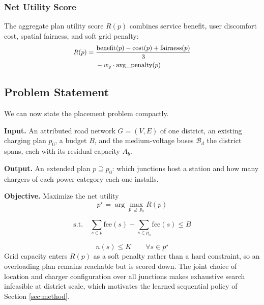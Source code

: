 \documentclass[10pt, conference, a4paper, compsocconf]{IEEEtran}
\begin{document}
\subsubsection{Net Utility Score}
The aggregate plan utility score $R(p)$ combines service benefit, user discomfort cost, spatial fairness, and soft grid penalty:
\begin{equation}\small
\begin{aligned}
R(p) = {} & \frac{\text{benefit}(p) - \text{cost}(p) + \text{fairness}(p)}{3} \\
          & - w_g \cdot \text{avg\_penalty}(p)
\end{aligned}
\end{equation}
\subsection{Problem Statement}

We can now state the placement problem compactly.

\textbf{Input.} An attributed road network $G=(V,E)$ of one district, an existing charging plan $p_0$, a budget $B$, and the medium-voltage buses $\mathcal{B}_d$ the district spans, each with its residual capacity $A_b$.

\textbf{Output.} An extended plan $p \supseteq p_0$: which junctions host a station and how many chargers of each power category each one installs.

\textbf{Objective.} Maximize the net utility
\begin{equation}
p^\star = \arg\max_{p \,\supseteq\, p_0} R(p)
\tag{4}
\end{equation}

\begin{equation}
\text{s.t.}\quad
\sum_{s \in p} \text{fee}(s)
-\sum_{s \in p_0} \text{fee}(s) \leq B
\tag{5}
\end{equation}

\begin{equation}
n(s) \leq K
\qquad \forall s \in p^\star
\tag{6}
\end{equation}
Grid capacity enters $R(p)$ as a soft penalty rather than a hard constraint, so an overloading plan remains reachable but is scored down. The joint choice of location and charger configuration over all junctions makes exhaustive search infeasible at district scale, which motivates the learned sequential policy of Section \ref{sec:method}.

\end{document}

